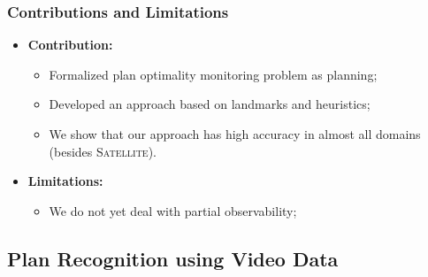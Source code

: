 \documentclass{beamer}
\newcommand{\todo}[1]{ {\color{red} #1} }
\begin{document}
\begin{frame}[c]\frametitle{Contributions and Limitations}
   	\begin{itemize}
   		\item \textbf{Contribution:}
			\begin{itemize}
				\item Formalized plan optimality monitoring problem as planning;
				\item Developed an approach based on landmarks and heuristics;
				\item We show that our approach has high accuracy in almost all domains (besides \textsc{Satellite}).
			\end{itemize}
		\item \textbf{Limitations:}
			\begin{itemize}
				\item We do not yet deal with partial observability;
			\end{itemize}
	\end{itemize}
\end{frame}	
\fi

\subsection{Plan Recognition using Video Data}
\end{document}
